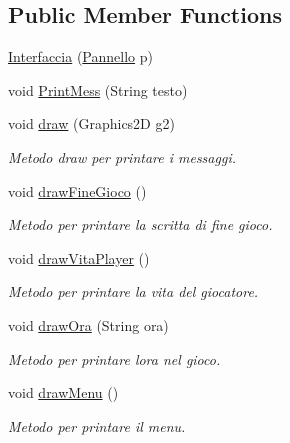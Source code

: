 \subsection*{Public Member Functions}
\begin{DoxyCompactItemize}
\item 
\hyperlink{classa_1_1survival_1_1game_1_1_interfaccia_adcff06a15c5f6ba258455f184dd915fb}{Interfaccia} (\hyperlink{classa_1_1survival_1_1game_1_1_pannello}{Pannello} p)
\item 
void \hyperlink{classa_1_1survival_1_1game_1_1_interfaccia_ae9b898a41ae435279045781f39227899}{Print\+Mess} (String testo)
\item 
void \hyperlink{classa_1_1survival_1_1game_1_1_interfaccia_ae8c972c0fb4fcbc09c2219dd32cbd053}{draw} (Graphics2D g2)
\begin{DoxyCompactList}\small\item\em Metodo draw per printare i messaggi. \end{DoxyCompactList}\item 
void \hyperlink{classa_1_1survival_1_1game_1_1_interfaccia_afb3918edf3e2da123a3585258d5c5045}{draw\+Fine\+Gioco} ()
\begin{DoxyCompactList}\small\item\em Metodo per printare la scritta di fine gioco. \end{DoxyCompactList}\item 
void \hyperlink{classa_1_1survival_1_1game_1_1_interfaccia_a24697f9d9cd1d55fc26a7b7c0fd26697}{draw\+Vita\+Player} ()
\begin{DoxyCompactList}\small\item\em Metodo per printare la vita del giocatore. \end{DoxyCompactList}\item 
void \hyperlink{classa_1_1survival_1_1game_1_1_interfaccia_a2dc05af87e20aefac5da3cd184d09456}{draw\+Ora} (String ora)
\begin{DoxyCompactList}\small\item\em Metodo per printare l\textquotesingle{}ora nel gioco. \end{DoxyCompactList}\item 
void \hyperlink{classa_1_1survival_1_1game_1_1_interfaccia_aa13653318c21b0e6b86838e6091bfc9a}{draw\+Menu} ()
\begin{DoxyCompactList}\small\item\em Metodo per printare il menu. \end{DoxyCompactList}\item 

\end{DoxyCompactItemize}
